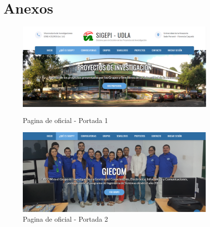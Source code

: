 \section*{Anexos}

\begin{figure}[htbp]
	\centering
	\includegraphics[width=100mm]{resources/capturas/inicio.png} 
	\caption{Pagina de oficial - Portada 1} \label{anexo:pagina_inicio1}	
	\includegraphics[width=100mm]{resources/capturas/inicio2.png}
	\caption{Pagina de oficial - Portada 2} \label{anexo:pagina_inicio2}
\end{figure}